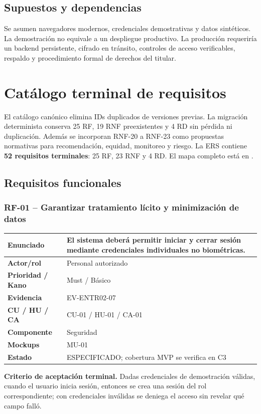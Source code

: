 \documentclass[11pt,a4paper,twoside]{article}
\begin{document}
\subsection{Supuestos y dependencias}
Se asumen navegadores modernos, credenciales demostrativas y datos sintéticos. La demostración no equivale a un despliegue productivo. La producción requeriría un backend persistente, cifrado en tránsito, controles de acceso verificables, respaldo y procedimiento formal de derechos del titular.

\section{Catálogo terminal de requisitos}
El catálogo canónico elimina IDs duplicados de versiones previas. La migración determinista conserva 25 RF, 19 RNF preexistentes y 4 RD sin pérdida ni duplicación. Además se incorporan RNF-20 a RNF-23 como propuestas normativas para recomendación, equidad, monitoreo y riesgo. La ERS contiene \textbf{52 requisitos terminales}: 25 RF, 23 RNF y 4 RD. El mapa completo está en .

\subsection{Requisitos funcionales}
\subsubsection{RF-01 -- Garantizar tratamiento lícito y minimización de datos}
\begin{tabularx}{\textwidth}{|>{\bfseries}p{3.2cm}|X|}\hline
Enunciado & El sistema deberá permitir iniciar y cerrar sesión mediante credenciales individuales no biométricas. \\ \hline
Actor/rol & Personal autorizado \\ \hline
Prioridad / Kano & Must / Básico \\ \hline
Evidencia & EV-ENTR02-07 \\ \hline
CU / HU / CA & CU-01 / HU-01 / CA-01 \\ \hline
Componente & Seguridad \\ \hline
Mockups & MU-01 \\ \hline
Estado & ESPECIFICADO; cobertura MVP se verifica en C3 \\ \hline
\end{tabularx}
\textbf{Criterio de aceptación terminal.} Dadas credenciales de demostración válidas, cuando el usuario inicia sesión, entonces se crea una sesión del rol correspondiente; con credenciales inválidas se deniega el acceso sin revelar qué campo falló.
\end{document}
